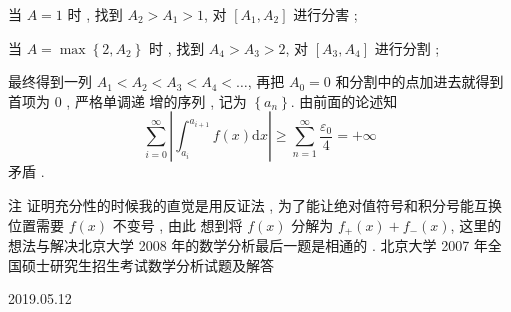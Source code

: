 \documentclass[10pt]{article}
\begin{document}
 当  $A=1$  时 ,  找到  $A_{2}>A_{1}>1$,  对  $\left[A_{1}, A_{2}\right]$  进行分害 ;

 当  $A=\max \left\{2, A_{2}\right\}$  时 ,  找到  $A_{4}>A_{3}>2$,  对  $\left[A_{3}, A_{4}\right]$  进行分割 ;

 最终得到一列  $A_{1}<A_{2}<A_{3}<A_{4}<\ldots$,  再把  $A_{0}=0$  和分割中的点加进去就得到首项为  0 ,  严格单调递   增的序列 ,  记为  $\left\{a_{n}\right\}$.  由前面的论述知 
$$
\sum_{i=0}^{\infty}\left|\int_{a_{i}}^{a_{i+1}} f(x) \mathrm{d} x\right| \geqslant \sum_{n=1}^{\infty} \frac{\varepsilon_{0}}{4}=+\infty
$$
 矛盾 .

 注   证明充分性的时候我的直觉是用反证法 ,  为了能让绝对值符号和积分号能互换位置需要  $f(x)$  不变号 ,  由此   想到将  $f(x)$  分解为  $f_{+}(x)+f_{-}(x)$,  这里的想法与解决北京大学  2008  年的数学分析最后一题是相通的 .  北京大学  2007  年全国硕士研究生招生考试数学分析试题及解答 

   

2019.05.12
\end{document}
